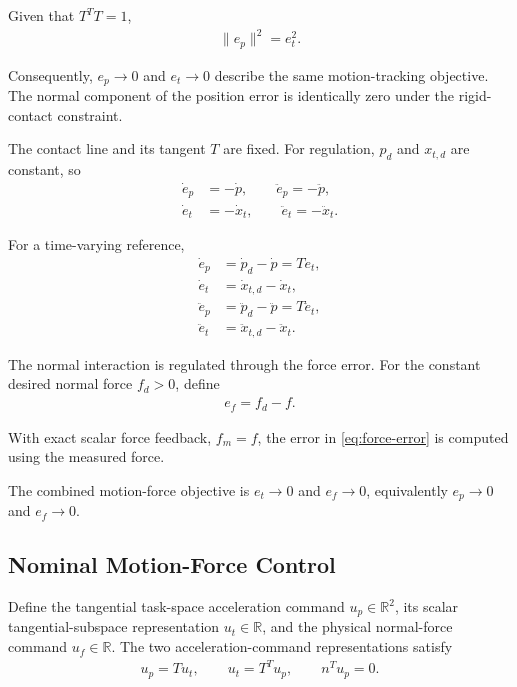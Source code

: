 \documentclass[10pt,journal,letterpaper]{IEEEtran}
\begin{document}
Given that $T^TT=1$,
\begin{align*}
\|e_p\|^2=e_t^2.
\end{align*}

Consequently, $e_p\to0$ and $e_t\to0$ describe the same motion-tracking objective. The normal component of the position error is identically zero under the rigid-contact constraint. 

The contact line and its tangent $T$ are fixed. For regulation, $p_d$ and $x_{t,d}$ are constant, so
\begin{align*}
\dot e_p&=-\dot p,\qquad \ddot e_p=-\ddot p,\\
\dot e_t&=-\dot x_t,\qquad \ddot e_t=-\ddot x_t.
\end{align*}

For a time-varying reference,
\begin{equation}\label{eq:error-derivatives}
\begin{aligned}
\dot e_p&=\dot p_d-\dot p=T\dot e_t,\\
\dot e_t&=\dot x_{t,d}-\dot x_t,\\
\ddot e_p&=\ddot p_d-\ddot p=T\ddot e_t,\\
\ddot e_t&=\ddot x_{t,d}-\ddot x_t.
\end{aligned}
\end{equation}

The normal interaction is regulated through the force error. For the constant desired normal force $f_d>0$, define
\begin{equation}\label{eq:force-error}
\begin{aligned}
e_f=f_d-f.
\end{aligned}
\end{equation}

With exact scalar force feedback, $f_m=f$, the error in \eqref{eq:force-error} is computed using the measured force.

The combined motion-force objective is $e_t\to0$ and $e_f\to0$, equivalently $e_p\to0$ and $e_f\to0$.
\subsection{Nominal Motion-Force Control}

Define the tangential task-space acceleration command $u_{p}\in\mathbb{R}^2$, its scalar tangential-subspace representation $u_{t}\in\mathbb{R}$, and the physical normal-force command $u_{f}\in\mathbb{R}$. The two acceleration-command representations satisfy
\begin{equation}\label{eq:command-geometry}
\begin{aligned}
u_{p}=Tu_{t},\qquad u_{t}=T^Tu_{p},\qquad n^Tu_{p}=0.
\end{aligned}
\end{equation}
\end{document}
